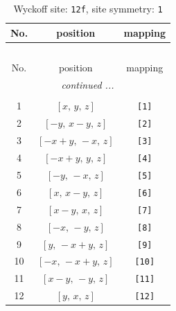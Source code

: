 \documentclass[fleqn,8pt]{jsarticle}
\begin{document}
\begin{longtable}{ccc}
\caption{Wyckoff site: {\tt 12f}, site symmetry: {\tt 1}}
 \\
 \hline \hline
No. & position & mapping \\ \hline \endfirsthead

\multicolumn{2}{l}{\tablename\ \thetable{}} \\
 \hline \hline
No. & position & mapping \\ \hline \endhead

 \hline \hline
\multicolumn{2}{r}{\footnotesize\it continued ...} \\ \endfoot

 \hline \hline
\multicolumn{2}{r}{} \\ \endlastfoot

1 & $\left[ x,\, y,\, z \right]$ & {\tt [1]} \\ \hline
2 & $\left[ - y,\, x - y,\, z \right]$ & {\tt [2]} \\ \hline
3 & $\left[ - x + y,\, - x,\, z \right]$ & {\tt [3]} \\ \hline
4 & $\left[ - x + y,\, y,\, z \right]$ & {\tt [4]} \\ \hline
5 & $\left[ - y,\, - x,\, z \right]$ & {\tt [5]} \\ \hline
6 & $\left[ x,\, x - y,\, z \right]$ & {\tt [6]} \\ \hline
7 & $\left[ x - y,\, x,\, z \right]$ & {\tt [7]} \\ \hline
8 & $\left[ - x,\, - y,\, z \right]$ & {\tt [8]} \\ \hline
9 & $\left[ y,\, - x + y,\, z \right]$ & {\tt [9]} \\ \hline
10 & $\left[ - x,\, - x + y,\, z \right]$ & {\tt [10]} \\ \hline
11 & $\left[ x - y,\, - y,\, z \right]$ & {\tt [11]} \\ \hline
12 & $\left[ y,\, x,\, z \right]$ & {\tt [12]} \\
\end{longtable}
\end{document}
